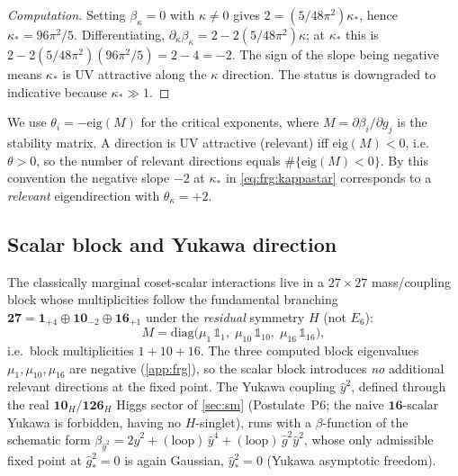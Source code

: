 \begin{proof}[Computation]
Setting $\beta_{\kappa}=0$ with $\kappa\neq0$ gives
$2=(5/48\pi^{2})\kappa_{\ast}$, hence $\kappa_{\ast}=96\pi^{2}/5$.
Differentiating, $\partial_{\kappa}\beta_{\kappa}=2-2(5/48\pi^{2})\kappa$;
at $\kappa_{\ast}$ this is $2-2(5/48\pi^{2})(96\pi^{2}/5)=2-4=-2$. The
sign of the slope being negative means $\kappa_{\ast}$ is UV attractive
along the $\kappa$ direction. The status is downgraded to indicative
because $\kappa_{\ast}\gg1$. \qedhere
\end{proof}

\begin{remark}
\label{rem:frg:convention}
We use $\theta_{i}=-\mathrm{eig}(M)$ for the critical exponents, where
$M=\partial\beta_{i}/\partial g_{j}$ is the stability matrix. A direction
is UV attractive (relevant) iff $\mathrm{eig}(M)<0$, i.e.\ $\theta>0$, so
the number of relevant directions equals $\#\{\mathrm{eig}(M)<0\}$. By this
convention the negative slope $-2$ at $\kappa_{\ast}$ in
\eqref{eq:frg:kappastar} corresponds to a \emph{relevant} eigendirection
with $\theta_{\kappa}=+2$.
\end{remark}

\subsection{Scalar block and Yukawa direction}
\label{sec:frg:scalar}

The classically marginal coset-scalar interactions live in a $27\times27$
mass/coupling block whose multiplicities follow the fundamental branching
$\mathbf{27}=\mathbf{1}_{+4}\oplus\mathbf{10}_{-2}\oplus\mathbf{16}_{+1}$
under the \emph{residual} symmetry $H$ (not $E_{6}$):
\begin{equation}\label{eq:frg:27block}
  M=\mathrm{diag}\bigl(\mu_{1}\,\mathbb{1}_{1},\;
                       \mu_{10}\,\mathbb{1}_{10},\;
                       \mu_{16}\,\mathbb{1}_{16}\bigr),
\end{equation}
i.e.\ block multiplicities $1+10+16$. The three computed block eigenvalues
$\mu_{1},\mu_{10},\mu_{16}$ are negative (\autoref{app:frg}), so the scalar
block introduces \emph{no} additional relevant directions at the fixed
point. The Yukawa coupling $\hat y^{2}$, defined through the real
$\mathbf{10}_{H}/\mathbf{126}_{H}$ Higgs sector of \autoref{sec:sm} (Postulate~P6;
the naive $\mathbf{16}$-scalar Yukawa is forbidden, having no $H$-singlet),
runs with a $\beta$-function of the schematic form
$\beta_{\hat y^{2}}=2\hat y^{2}+(\text{loop})\,\hat y^{4}+(\text{loop})\,\hat g^{2}\hat y^{2}$,
whose only admissible fixed point at $\hat g^{2}_{\ast}=0$ is again Gaussian,
$\hat y^{2}_{\ast}=0$ (Yukawa asymptotic freedom).

